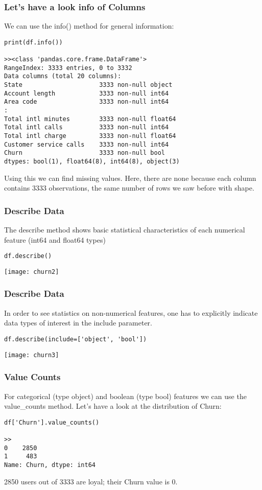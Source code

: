 \begin{frame}[fragile]\frametitle{Let's have a look info of Columns}	
We can use the info() method for general information:
\begin{lstlisting}
print(df.info())

>><class 'pandas.core.frame.DataFrame'>
RangeIndex: 3333 entries, 0 to 3332
Data columns (total 20 columns):
State                     3333 non-null object
Account length            3333 non-null int64
Area code                 3333 non-null int64
:
Total intl minutes        3333 non-null float64
Total intl calls          3333 non-null int64
Total intl charge         3333 non-null float64
Customer service calls    3333 non-null int64
Churn                     3333 non-null bool
dtypes: bool(1), float64(8), int64(8), object(3)
\end{lstlisting}
Using this we can find missing values. Here, there are none because each column contains 3333 observations, the same number of rows we saw before with shape.
\end{frame}


\begin{frame}[fragile]\frametitle{Describe Data}	
The describe method shows basic statistical characteristics of each numerical feature (int64 and float64 types)
\begin{lstlisting}
df.describe()
\end{lstlisting}
\begin{center}
\texttt{[image: churn2]}
\end{center}
\end{frame}

\begin{frame}[fragile]\frametitle{Describe Data}	
In order to see statistics on non-numerical features, one has to explicitly indicate data types of interest in the include parameter.
\begin{lstlisting}
df.describe(include=['object', 'bool'])
\end{lstlisting}
\begin{center}
\texttt{[image: churn3]}
\end{center}
\end{frame}

\begin{frame}[fragile]\frametitle{Value Counts}	
For categorical (type object) and boolean (type bool) features we can use the value\_counts method. Let’s have a look at the distribution of Churn:
\begin{lstlisting}
df['Churn'].value_counts()

>>
0    2850
1     483
Name: Churn, dtype: int64
\end{lstlisting}
2850 users out of 3333 are loyal; their Churn value is 0.
\end{frame}

